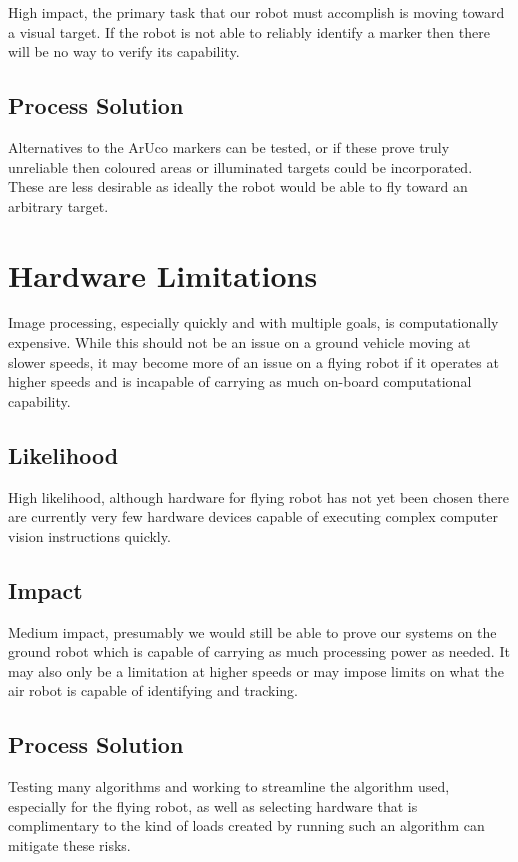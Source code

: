 \documentclass[]{report}
\begin{document}
High impact, the primary task that our robot must accomplish is moving toward a visual target. If the robot is not able to reliably identify a marker then there will be no way to verify its capability.

\subsection{Process Solution}

Alternatives to the ArUco markers can be tested, or if these prove truly unreliable then coloured areas or illuminated targets could be incorporated. These are less desirable as ideally the robot would be able to fly toward an arbitrary target.

\section{Hardware Limitations}

Image processing, especially quickly and with multiple goals, is computationally expensive. While this should not be an issue on a ground vehicle moving at slower speeds, it may become more of an issue on a flying robot if it operates at higher speeds and is incapable of carrying as much on-board computational capability.

\subsection{Likelihood}

High likelihood, although hardware for flying robot has not yet been chosen there are currently very few hardware devices capable of executing complex computer vision instructions quickly. 

\subsection{Impact}

Medium impact, presumably we would still be able to prove our systems on the ground robot which is capable of carrying as much processing power as needed. It may also only be a limitation at higher speeds or may impose limits on what the air robot is capable of identifying and tracking. 

\subsection{Process Solution}

Testing many algorithms and working to streamline the algorithm used, especially for the flying robot, as well as selecting hardware that is complimentary to the kind of loads created by running such an algorithm can mitigate these risks. 
\end{document}
